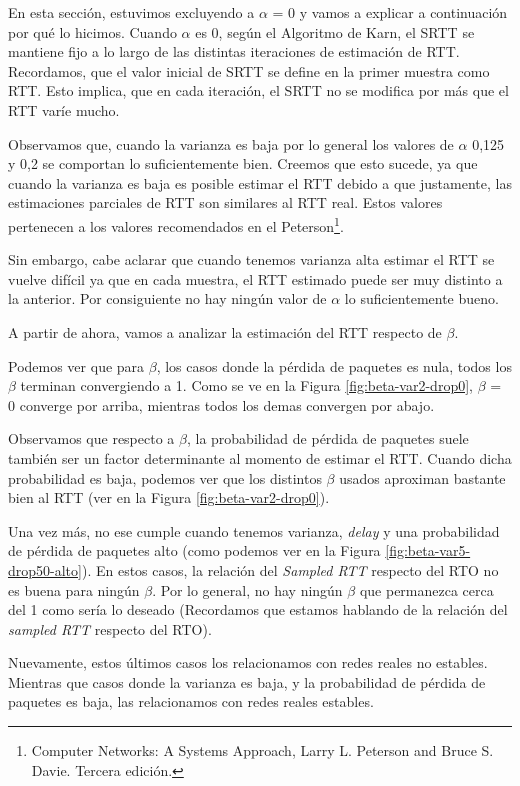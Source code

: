 En esta sección, estuvimos excluyendo a $\alpha$ = 0 y vamos a explicar a continuación por qué lo hicimos. Cuando $\alpha$ es 0, según el Algoritmo de Karn, el SRTT se mantiene fijo a lo largo de las distintas iteraciones de estimación de RTT. Recordamos, que el valor inicial de SRTT se define en la primer muestra como RTT. Esto implica, que en cada iteración, el SRTT no se modifica por más que el RTT varíe mucho.

Observamos que, cuando la varianza es baja por lo general los valores de $\alpha$ 0,125 y 0,2 se comportan lo suficientemente bien. Creemos que esto sucede, ya que cuando la varianza es baja es posible estimar el RTT debido a que justamente, las estimaciones parciales de RTT son similares al RTT real. Estos valores pertenecen a los valores recomendados en el Peterson\footnote{Computer Networks: A Systems Approach, Larry L. Peterson and Bruce S. Davie. Tercera edición.}.

Sin embargo, cabe aclarar que cuando tenemos varianza alta estimar el RTT se vuelve difícil ya que en cada muestra, el RTT estimado puede ser muy distinto a la anterior. Por consiguiente no hay ningún valor de $\alpha$ lo suficientemente bueno.


A partir de ahora, vamos a analizar la estimación del RTT respecto de $\beta$.

Podemos ver que para $\beta$, los casos donde la p\'erdida de paquetes es nula, todos los $\beta$ terminan convergiendo a 1. Como se ve en la Figura \ref{fig:beta-var2-drop0}, $\beta$ = 0 converge por arriba, mientras todos los demas convergen por abajo.

Observamos que respecto a $\beta$, la probabilidad de pérdida de paquetes suele también ser un factor determinante al momento de estimar el RTT. Cuando dicha probabilidad es baja, podemos ver que los distintos $\beta$ usados aproximan bastante bien al RTT (ver en la Figura \ref{fig:beta-var2-drop0}).

Una vez más, no ese cumple cuando tenemos varianza, \emph{delay} y una probabilidad de pérdida de paquetes alto (como podemos ver en la Figura \ref{fig:beta-var5-drop50-alto}). En estos casos, la relación del \emph{Sampled RTT} respecto del RTO no es buena para ningún $\beta$. Por lo general, no hay ningún $\beta$ que permanezca cerca del 1 como sería lo deseado (Recordamos que estamos hablando de la relación del \emph{sampled RTT} respecto del RTO).

Nuevamente, estos últimos casos los relacionamos con redes reales no estables. Mientras que casos donde la varianza es baja, y la probabilidad de pérdida de paquetes es baja, las relacionamos con redes reales estables.

